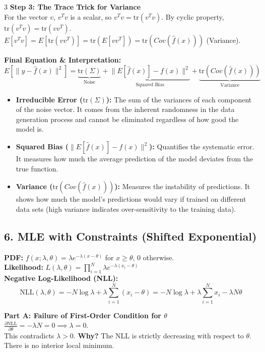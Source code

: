 \documentclass[10pt,landscape]{article}
\begin{document}
\begin{multicols*}{3}
\textbf{Step 3: The Trace Trick for Variance} \\
For the vector $v$, $v^Tv$ is a scalar, so $v^Tv = \text{tr}(v^Tv)$. By cyclic property, $\text{tr}(v^Tv) = \text{tr}(vv^T)$. \\
$E[v^Tv] = E[\text{tr}(vv^T)] = \text{tr}(E[vv^T]) = \text{tr}(Cov(\hat{f}(x)))$ (Variance).

\textbf{Final Equation \& Interpretation:} \\
$$E[\|y - \hat{f}(x)\|^2] = \underbrace{\text{tr}(\Sigma)}_{\text{Noise}} + \underbrace{\|E[\hat{f}(x)] - f(x)\|^2}_{\text{Squared Bias}} + \underbrace{\text{tr}(Cov(\hat{f}(x)))}_{\text{Variance}}$$

\begin{itemize}
    \item \textbf{Irreducible Error ($\text{tr}(\Sigma)$):} The sum of the variances of each component of the noise vector. It comes from the inherent randomness in the data generation process and cannot be eliminated regardless of how good the model is.
    \item \textbf{Squared Bias ($\|E[\hat{f}(x)] - f(x)\|^2$):} Quantifies the systematic error. It measures how much the average prediction of the model deviates from the true function.
    \item \textbf{Variance ($\text{tr}(Cov(\hat{f}(x)))$):} Measures the instability of predictions. It shows how much the model's predictions would vary if trained on different data sets (high variance indicates over-sensitivity to the training data).
\end{itemize}

\subsection*{6. MLE with Constraints (Shifted Exponential)}
\textbf{PDF:} $f(x; \lambda, \theta) = \lambda e^{-\lambda(x-\theta)}$ for $x \ge \theta$, $0$ otherwise. \\
\textbf{Likelihood:} $L(\lambda, \theta) = \prod_{i=1}^N \lambda e^{-\lambda(x_i - \theta)}$ \\
\textbf{Negative Log-Likelihood (NLL):}
$$ \text{NLL}(\lambda, \theta) = -N \log \lambda + \lambda \sum_{i=1}^N (x_i - \theta) = -N \log \lambda + \lambda \sum_{i=1}^N x_i - \lambda N \theta $$

\textbf{Part A: Failure of First-Order Condition for $\theta$} \\
$\frac{\partial \text{NLL}}{\partial \theta} = -\lambda N = 0 \implies \lambda = 0$. \\
This contradicts $\lambda > 0$. \textbf{Why?} The NLL is strictly decreasing with respect to $\theta$. There is no interior local minimum.


\end{multicols*}
\end{document}
